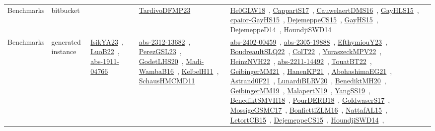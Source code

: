 {\begin{longtable}{lp{3cm}>{\raggedright\arraybackslash}p{6cm}>{\raggedright\arraybackslash}p{6cm}>{\raggedright\arraybackslash}p{8cm}}
Benchmarks & bitbucket &  & \href{papers/TardivoDFMP23.pdf}{TardivoDFMP23}~\cite{TardivoDFMP23} & \href{papers/He0GLW18.pdf}{He0GLW18}~\cite{He0GLW18}, \href{papers/CappartS17.pdf}{CappartS17}~\cite{CappartS17}, \href{papers/CauwelaertDMS16.pdf}{CauwelaertDMS16}~\cite{CauwelaertDMS16}, \href{papers/GayHLS15.pdf}{GayHLS15}~\cite{GayHLS15}, \href{papers/cpaior-GayHS15.pdf}{cpaior-GayHS15}~\cite{cpaior-GayHS15}, \href{papers/DejemeppeCS15.pdf}{DejemeppeCS15}~\cite{DejemeppeCS15}, \href{papers/GayHS15.pdf}{GayHS15}~\cite{GayHS15}, \href{papers/DejemeppeD14.pdf}{DejemeppeD14}~\cite{DejemeppeD14}, \href{papers/HoundjiSWD14.pdf}{HoundjiSWD14}~\cite{HoundjiSWD14}\\
Benchmarks & generated instance & \href{articles/IsikYA23.pdf}{IsikYA23}~\cite{IsikYA23}, \href{papers/LuoB22.pdf}{LuoB22}~\cite{LuoB22}, \href{articles/abs-1911-04766.pdf}{abs-1911-04766}~\cite{abs-1911-04766} & \href{articles/abs-2312-13682.pdf}{abs-2312-13682}~\cite{abs-2312-13682}, \href{papers/PerezGSL23.pdf}{PerezGSL23}~\cite{PerezGSL23}, \href{papers/GodetLHS20.pdf}{GodetLHS20}~\cite{GodetLHS20}, \href{papers/Madi-WambaB16.pdf}{Madi-WambaB16}~\cite{Madi-WambaB16}, \href{articles/KelbelH11.pdf}{KelbelH11}~\cite{KelbelH11}, \href{articles/SchausHMCMD11.pdf}{SchausHMCMD11}~\cite{SchausHMCMD11} & \href{articles/abs-2402-00459.pdf}{abs-2402-00459}~\cite{abs-2402-00459}, \href{articles/abs-2305-19888.pdf}{abs-2305-19888}~\cite{abs-2305-19888}, \href{papers/EfthymiouY23.pdf}{EfthymiouY23}~\cite{EfthymiouY23}, \href{papers/BoudreaultSLQ22.pdf}{BoudreaultSLQ22}~\cite{BoudreaultSLQ22}, \href{articles/ColT22.pdf}{ColT22}~\cite{ColT22}, \href{articles/YuraszeckMPV22.pdf}{YuraszeckMPV22}~\cite{YuraszeckMPV22}, \href{articles/HeinzNVH22.pdf}{HeinzNVH22}~\cite{HeinzNVH22}, \href{articles/abs-2211-14492.pdf}{abs-2211-14492}~\cite{abs-2211-14492}, \href{papers/TouatBT22.pdf}{TouatBT22}~\cite{TouatBT22}, \href{papers/GeibingerMM21.pdf}{GeibingerMM21}~\cite{GeibingerMM21}, \href{papers/HanenKP21.pdf}{HanenKP21}~\cite{HanenKP21}, \href{articles/AbohashimaEG21.pdf}{AbohashimaEG21}~\cite{AbohashimaEG21}, \href{papers/Astrand0F21.pdf}{Astrand0F21}~\cite{Astrand0F21}, \href{articles/LunardiBLRV20.pdf}{LunardiBLRV20}~\cite{LunardiBLRV20}, \href{articles/BenediktMH20.pdf}{BenediktMH20}~\cite{BenediktMH20}, \href{papers/GeibingerMM19.pdf}{GeibingerMM19}~\cite{GeibingerMM19}, \href{papers/MalapertN19.pdf}{MalapertN19}~\cite{MalapertN19}, \href{papers/YangSS19.pdf}{YangSS19}~\cite{YangSS19}, \href{papers/BenediktSMVH18.pdf}{BenediktSMVH18}~\cite{BenediktSMVH18}, \href{articles/PourDERB18.pdf}{PourDERB18}~\cite{PourDERB18}, \href{papers/GoldwaserS17.pdf}{GoldwaserS17}~\cite{GoldwaserS17}, \href{papers/MossigeGSMC17.pdf}{MossigeGSMC17}~\cite{MossigeGSMC17}, \href{papers/BonfiettiZLM16.pdf}{BonfiettiZLM16}~\cite{BonfiettiZLM16}, \href{articles/NattafAL15.pdf}{NattafAL15}~\cite{NattafAL15}, \href{articles/LetortCB15.pdf}{LetortCB15}~\cite{LetortCB15}, \href{papers/DejemeppeCS15.pdf}{DejemeppeCS15}~\cite{DejemeppeCS15}, \href{papers/HoundjiSWD14.pdf}{HoundjiSWD14}~\cite{HoundjiSWD14}, 
\end{longtable}}
